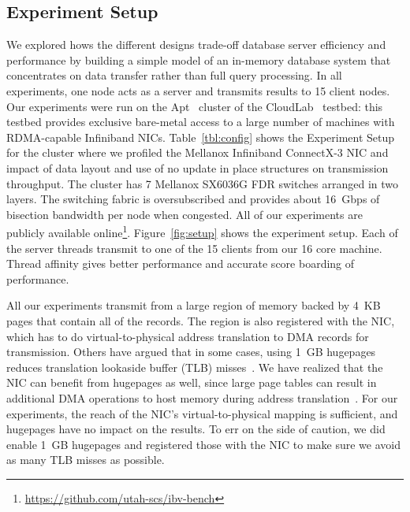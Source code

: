 \subsection{Experiment Setup}
We explored hows the different designs trade-off database server efficiency and
performance by building a simple model of an in-memory database system that
concentrates on data transfer rather than full query processing. In all experiments,
one node acts as a server and transmits results to 15 client nodes.
Our experiments were run on the Apt~\cite{Ricci+:OSR15} cluster of the
CloudLab~\cite{Cloudlab:URL} testbed: this testbed provides exclusive bare-metal
access to a large number of machines with RDMA-capable Infiniband NICs.
Table~\ref{tbl:config} shows the Experiment Setup for the cluster where we profiled
the Mellanox Infiniband ConnectX-3 \textregistered NIC and impact of data layout and 
use of no update in place structures on transmission throughput. The cluster has 7
Mellanox SX6036G FDR switches arranged in two layers. The switching fabric is
oversubscribed and provides about 16~Gbps of bisection bandwidth per node
when congested. All of our experiments are publicly available online\footnote{\url{https://github.com/utah-scs/ibv-bench}}.
Figure~\ref{fig:setup} shows the experiment setup. Each of the server threads transmit to one of the 15 clients from our 16 core machine. 
Thread affinity gives better performance and accurate score boarding of performance.


All our experiments transmit from a large region of memory backed by 4~KB pages
that contain all of the records. The region is also
registered with the NIC, which has to do virtual-to-physical address
translation to DMA records for transmission.
Others have argued that in some cases, using 1~GB hugepages reduces translation lookaside buffer
(TLB) misses~\cite{infinibandhugepages}. We have realized that the NIC can benefit from
hugepages as well, since large page tables can result in additional
DMA operations to host memory during address translation~\cite{farm,rdma}. For
our experiments, the reach of the NIC's virtual-to-physical mapping is
sufficient, and hugepages have no impact on the results. To err on the side of caution, 
we did enable 1~GB hugepages and registered those with the NIC to make sure we 
avoid as many TLB misses as possible.



